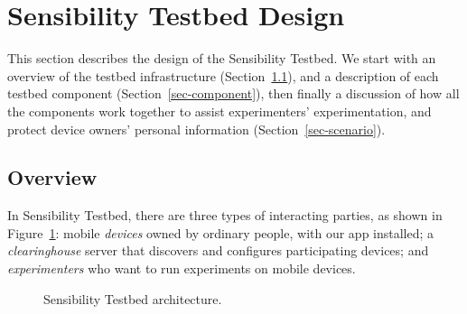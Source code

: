 \section{Sensibility Testbed Design}\label{sec-design}

This section describes the design of the Sensibility Testbed. 
We start with
an overview of the testbed infrastructure (Section~\ref{sec-overview}), 
and a description of each testbed component 
(Section~\ref{sec-component}), then finally a discussion of how all the 
components work together to assist experimenters' experimentation,
and protect device owners' personal information 
(Section~\ref{sec-scenario}).


\subsection{Overview}\label{sec-overview}

In Sensibility Testbed, there are three types of interacting
parties, as shown in Figure~\ref{fig-arch}: mobile \textit{devices} 
owned by ordinary people, with our app installed; a 
\textit{clearinghouse} server that discovers and configures
participating devices; and \textit{experimenters} who want to run
experiments on mobile devices. 

\begin{figure}
\caption{\small Sensibility Testbed architecture. \label{fig-arch}}
\end{figure}

